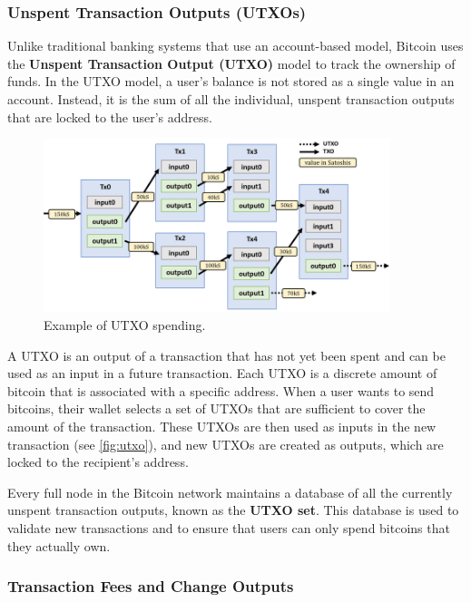 \subsubsection{Unspent Transaction Outputs
	(UTXOs)}\label{unspent-transaction-outputs-utxos}

Unlike traditional banking systems that use an account-based model,
Bitcoin uses the \textbf{Unspent Transaction Output (UTXO)} model to
track the ownership of funds. In the UTXO model, a user's balance is not
stored as a single value in an account. Instead, it is the sum of all
the individual, unspent transaction outputs that are locked to the
user's address.

\begin{figure}[t]
	\begin{center}
		\includegraphics[width=0.9\textwidth]{./figs/utxo.png}
		\caption{Example of UTXO spending.}		
		\label{fig:utxo}
	\end{center}	
\end{figure}

A UTXO is an output of a transaction that has not yet been spent and can
be used as an input in a future transaction. Each UTXO is a discrete
amount of bitcoin that is associated with a specific address. When a
user wants to send bitcoins, their wallet selects a set of UTXOs that
are sufficient to cover the amount of the transaction. These UTXOs are
then used as inputs in the new transaction (see \autoref{fig:utxo}), and new UTXOs are created as
outputs, which are locked to the recipient's address.

Every full node in the Bitcoin network maintains a database of all the
currently unspent transaction outputs, known as the \textbf{UTXO set}. This
database is used to validate new transactions and to ensure that users
can only spend bitcoins that they actually own.

\subsubsection{Transaction Fees and Change
	Outputs}\label{transaction-fees-and-change-outputs}

